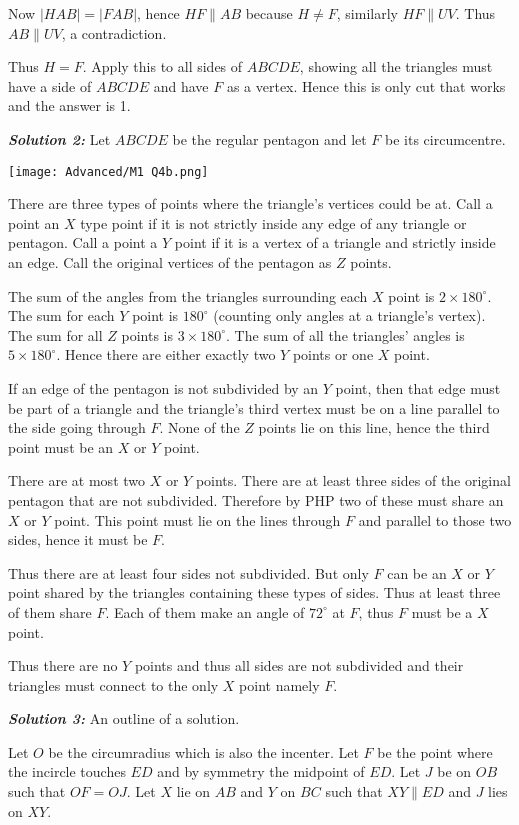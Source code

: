 \documentclass[12pt]{article}
\newcommand{\solnum}[1]{\textbf{\textit{Solution #1: }}}
\begin{document}
\begin{enumerate}[topsep=\bigskipamount,itemsep=\bigskipamount,leftmargin=0pt]
Now $|HAB| = |FAB|$, hence $HF\parallel AB$ because $H\neq F$, similarly $HF\parallel UV$.
Thus $AB\parallel UV$, a contradiction.

Thus $H=F$. Apply this to all sides of $ABCDE$, showing all the triangles must have a side of $ABCDE$ and have $F$ as a vertex.
Hence this is only cut that works and the answer is 1.

\solnum{2}
Let $ABCDE$ be the regular pentagon and let $F$ be its circumcentre.

\texttt{[image: Advanced/M1 Q4b.png]}

There are three types of points where the triangle's vertices could be at.
Call a point an $X$ type point if it is not strictly inside any edge of any triangle or pentagon.
Call a point a $Y$ point if it is a vertex of a triangle and strictly inside an edge.
Call the original vertices of the pentagon as $Z$ points.

The sum of the angles from the triangles surrounding each $X$ point is $2\times 180^\circ$.
The sum for each $Y$ point is $180^\circ$ (counting only angles at a triangle's vertex).
The sum for all $Z$ points is $3\times 180^\circ$.
The sum of all the triangles' angles is $5\times 180^\circ$.
Hence there are either exactly two $Y$ points or one $X$ point.

If an edge of the pentagon is not subdivided by an $Y$ point, then that edge must be part of a triangle and the triangle's third vertex must be on a line parallel to the side going through $F$.
None of the $Z$ points lie on this line, hence the third point must be an $X$ or $Y$ point.

There are at most two $X$ or $Y$ points.
There are at least three sides of the original pentagon that are not subdivided.
Therefore by PHP two of these must share an $X$ or $Y$ point.
This point must lie on the lines through $F$ and parallel to those two sides,
hence it must be $F$.

Thus there are at least four sides not subdivided.
But only $F$ can be an $X$ or $Y$ point shared by the triangles containing these types of sides.
Thus at least three of them share $F$.
Each of them make an angle of $72^\circ$ at $F$, thus $F$ must be a $X$ point.

Thus there are no $Y$ points and thus all sides are not subdivided and their triangles must connect to the only $X$ point namely $F$.

\solnum{3}
An outline of a solution.

Let $O$ be the circumradius which is also the incenter.
Let $F$ be the point where the incircle touches $ED$ and by symmetry the midpoint of $ED$.
Let $J$ be on $OB$ such that $OF=OJ$.
Let $X$ lie on $AB$ and $Y$ on $BC$ such that $XY\parallel ED$ and $J$ lies on $XY$.


\end{enumerate}
\end{document}
